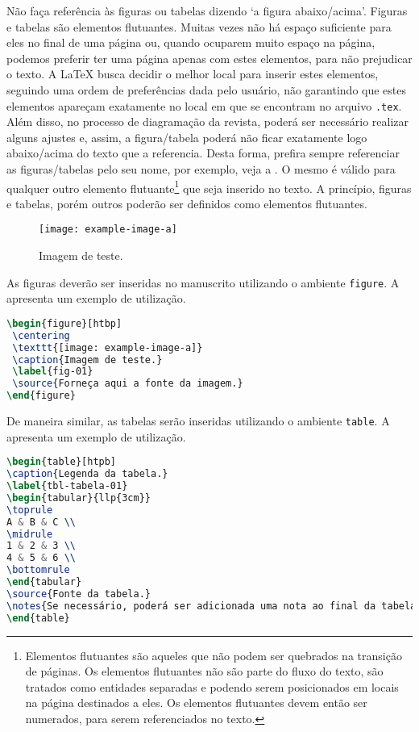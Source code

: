\documentclass{textolivre}
\begin{document}
Não faça referência às figuras ou tabelas dizendo `a figura abaixo/acima'.
Figuras e tabelas são elementos flutuantes. Muitas vezes não há espaço suficiente para
eles no final de uma página ou, quando ocuparem muito espaço na página, podemos preferir
ter uma página apenas com estes elementos, para não prejudicar o texto.
A \LaTeX{} busca decidir o melhor local para inserir estes elementos, seguindo uma ordem 
de preferências dada pelo usuário, não garantindo que estes elementos apareçam exatamente
no local em que se encontram no arquivo \verb|.tex|. Além disso, no processo de diagramação 
da revista, poderá ser necessário realizar alguns ajustes e, assim, a figura/tabela poderá 
não ficar exatamente logo abaixo/acima do texto que a referencia.
Desta forma, prefira sempre referenciar as figuras/tabelas pelo seu nome, 
por exemplo, veja a . O mesmo é válido para qualquer outro elemento flutuante\footnote{
Elementos flutuantes são aqueles que não podem ser quebrados na transição de páginas. 
Os elementos flutuantes não são parte do fluxo do texto, são tratados como entidades separadas 
e podendo serem posicionados em locais na página destinados a eles. Os elementos flutuantes devem então
ser numerados, para serem referenciados no texto. 
}
que seja inserido no texto. A princípio, figuras e tabelas, porém outros poderão ser definidos 
como elementos flutuantes. 

\begin{figure}[htbp]
 \centering
 \texttt{[image: example-image-a]}
 \caption{Imagem de teste.}
 \label{fig-img-a}
\end{figure}

As figuras deverão ser inseridas no manuscrito utilizando o ambiente \verb|figure|.
A  apresenta um exemplo de utilização.
\begin{lstlisting}[language=tex, label=lst-figure, caption={Inserindo uma figura.}]
\begin{figure}[htbp]
 \centering
 \texttt{[image: example-image-a]}
 \caption{Imagem de teste.}
 \label{fig-01}
 \source{Forneça aqui a fonte da imagem.}
\end{figure}
\end{lstlisting} %


\lipsum[12]


De maneira similar, as tabelas serão inseridas utilizando o ambiente \verb|table|.
A  apresenta um exemplo de utilização.
\begin{lstlisting}[language=tex, label=lst-table, caption={Inserindo uma tabela.}]
\begin{table}[htpb]
\caption{Legenda da tabela.}
\label{tbl-tabela-01}
\begin{tabular}{llp{3cm}}
\toprule 
A & B & C \\ 
\midrule
1 & 2 & 3 \\ 
4 & 5 & 6 \\ 
\bottomrule
\end{tabular}
\source{Fonte da tabela.}
\notes{Se necessário, poderá ser adicionada uma nota ao final da tabela.}
\end{table}
\end{lstlisting} %
\end{document}
